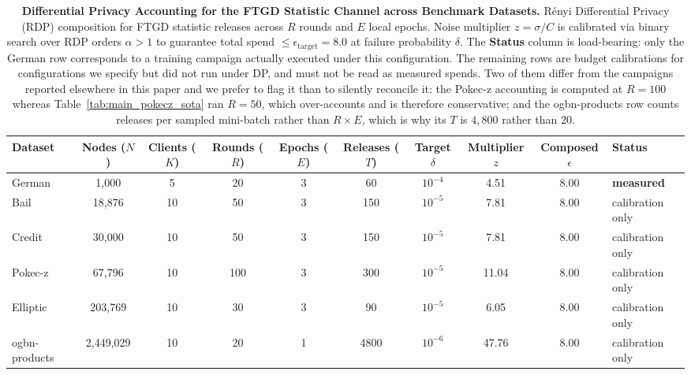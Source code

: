 \begin{table}[t]
\centering
\small
\caption{\textbf{Differential Privacy Accounting for the FTGD Statistic Channel across Benchmark Datasets.}
R\'{e}nyi Differential Privacy (RDP) composition for FTGD statistic releases across $R$ rounds and $E$ local epochs.
Noise multiplier $z = \sigma / C$ is calibrated via binary search over RDP orders $\alpha > 1$ to guarantee total spend $\le \epsilon_{\text{target}} = 8.0$ at failure probability $\delta$.
The \textbf{Status} column is load-bearing: only the German row corresponds to a training campaign actually executed under this configuration. The remaining rows are budget calibrations for configurations we specify but did not run under DP, and must not be read as measured spends. Two of them differ from the campaigns reported elsewhere in this paper and we prefer to flag it than to silently reconcile it: the Pokec-z accounting is computed at $R{=}100$ whereas Table~\ref{tab:main_pokecz_sota} ran $R{=}50$, which over-accounts and is therefore conservative; and the ogbn-products row counts releases per sampled mini-batch rather than $R \times E$, which is why its $T$ is $4{,}800$ rather than $20$.}
\label{tab:dp_accounting}
\begin{tabular}{lccccccccl}
\toprule
\textbf{Dataset} & \textbf{Nodes ($N$)} & \textbf{Clients ($K$)} & \textbf{Rounds ($R$)} & \textbf{Epochs ($E$)} & \textbf{Releases ($T$)} & \textbf{Target $\delta$} & \textbf{Multiplier $z$} & \textbf{Composed $\epsilon$} & \textbf{Status} \\
\midrule
German & 1,000 & 5 & 20 & 3 & 60 & $10^{-4}$ & 4.51 & 8.00 & \textbf{measured} \\
Bail & 18,876 & 10 & 50 & 3 & 150 & $10^{-5}$ & 7.81 & 8.00 & calibration only \\
Credit & 30,000 & 10 & 50 & 3 & 150 & $10^{-5}$ & 7.81 & 8.00 & calibration only \\
Pokec-z & 67,796 & 10 & 100 & 3 & 300 & $10^{-5}$ & 11.04 & 8.00 & calibration only \\
Elliptic & 203,769 & 10 & 30 & 3 & 90 & $10^{-5}$ & 6.05 & 8.00 & calibration only \\
ogbn-products & 2,449,029 & 10 & 20 & 1 & 4800 & $10^{-6}$ & 47.76 & 8.00 & calibration only \\
\bottomrule
\end{tabular}
\end{table}
